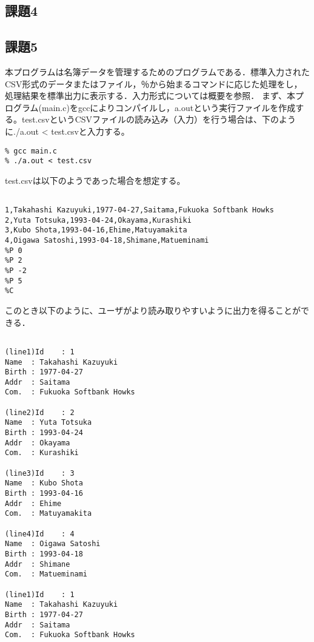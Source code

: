 \documentclass[a4j]{jarticle}
\begin{document}
\begin{enumerate}
\subsection{課題4}



\subsection{課題5}



本プログラムは名簿データを管理するためのプログラムである．標準入力されたCSV形式のデータまたはファイル，％から始まるコマンドに応じた処理をし，処理結果を標準出力に表示する．入力形式については概要を参照．
まず、本プログラム(main.c)をgccによりコンパイルし，a.outという実行ファイルを作成する。test.csvというCSVファイルの読み込み（入力）を行う場合は、下のように./a.out < test.csvと入力する。

{\baselineskip 3mm
\begin{verbatim}
% gcc main.c
% ./a.out < test.csv
\end{verbatim}
}

test.csvは以下のようであった場合を想定する。

{\baselineskip 3mm
\begin{verbatim}

1,Takahashi Kazuyuki,1977-04-27,Saitama,Fukuoka Softbank Howks
2,Yuta Totsuka,1993-04-24,Okayama,Kurashiki
3,Kubo Shota,1993-04-16,Ehime,Matuyamakita
4,Oigawa Satoshi,1993-04-18,Shimane,Matueminami
%P 0
%P 2
%P -2
%P 5
%C
\end{verbatim}
}

このとき以下のように、ユーザがより読み取りやすいように出力を得ることができる．

{\baselineskip 3mm
\begin{verbatim}

(line1)Id    : 1
Name  : Takahashi Kazuyuki
Birth : 1977-04-27
Addr  : Saitama
Com.  : Fukuoka Softbank Howks

(line2)Id    : 2
Name  : Yuta Totsuka
Birth : 1993-04-24
Addr  : Okayama
Com.  : Kurashiki

(line3)Id    : 3
Name  : Kubo Shota
Birth : 1993-04-16
Addr  : Ehime
Com.  : Matuyamakita

(line4)Id    : 4
Name  : Oigawa Satoshi
Birth : 1993-04-18
Addr  : Shimane
Com.  : Matueminami

(line1)Id    : 1
Name  : Takahashi Kazuyuki
Birth : 1977-04-27
Addr  : Saitama
Com.  : Fukuoka Softbank Howks


\end{verbatim}}
\end{enumerate}
\end{document}
